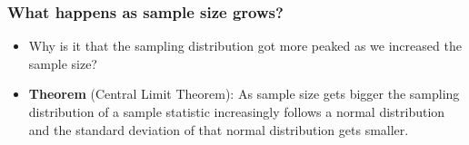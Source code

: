 \documentclass[aspectratio=169]{beamer}
\theoremstyle{principle}
\begin{document}
%
%

\begin{frame}
\frametitle{What happens as sample size grows?}

\begin{itemize}
\item Why is it that the sampling distribution got more peaked as we increased the sample size?
\bigskip
\bigskip
\bigskip
\item \textbf{Theorem} (Central Limit Theorem): As sample size gets bigger the sampling distribution of a sample statistic increasingly follows a normal distribution and the standard deviation of that normal distribution gets smaller.
\end{itemize}

\end{frame}
\end{document}
